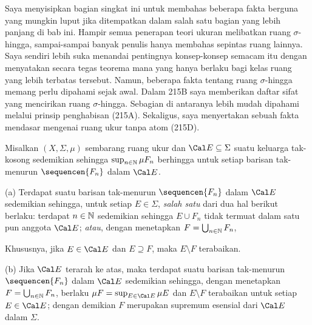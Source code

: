 
\def\chaptername{Taksonomi ruang ukur}
\def\sectionname{Ruang $\sigma$-hingga dan prinsip penghabisan}


Saya menyisipkan bagian singkat ini untuk membahas beberapa fakta berguna
yang mungkin luput jika ditempatkan dalam salah satu bagian yang lebih panjang
di bab ini. Hampir semua penerapan teori ukuran melibatkan ruang
$\sigma$-hingga, sampai-sampai banyak penulis hanya membahas sepintas ruang
lainnya. Saya sendiri lebih suka menandai pentingnya konsep-konsep semacam itu
dengan menyatakan secara tegas teorema mana yang hanya berlaku bagi kelas
ruang yang lebih terbatas tersebut. Namun, beberapa fakta tentang ruang
$\sigma$-hingga memang perlu dipahami sejak awal. Dalam 215B saya memberikan
daftar sifat yang mencirikan ruang $\sigma$-hingga. Sebagian di antaranya lebih
mudah dipahami melalui prinsip penghabisan (215A). Sekaligus, saya menyertakan
sebuah fakta mendasar mengenai ruang ukur
tanpa atom (215D).

 Misalkan $(X,\Sigma,\mu)$ sembarang ruang ukur dan
$\Cal E\subseteq\Sigma$ suatu keluarga tak-kosong sedemikian sehingga
$\sup_{n\in\Bbb N}\mu F_n$ berhingga untuk setiap barisan tak-menurun
$\sequencen{F_n}$ dalam $\Cal E$.

(a) Terdapat suatu barisan tak-menurun $\sequencen{F_n}$ dalam $\Cal E$
sedemikian sehingga, untuk setiap $E\in\Sigma$, {\it salah satu} dari dua
hal berikut berlaku: terdapat $n\in\Bbb N$ sedemikian sehingga $E\cup F_n$
tidak termuat dalam satu pun anggota $\Cal E$; {\it atau}, dengan menetapkan
$F=\bigcup_{n\in\Bbb N}F_n$,


\noindent Khususnya, jika $E\in\Cal E$ dan $E\supseteq F$, maka
$E\setminus F$ terabaikan.

(b) Jika $\Cal E$ terarah ke atas, maka terdapat suatu barisan tak-menurun
$\sequencen{F_n}$ dalam $\Cal E$ sedemikian sehingga, dengan menetapkan
$F=\bigcup_{n\in\Bbb N}F_n$, berlaku $\mu F=\sup_{E\in\Cal E}\mu E$ dan
$E\setminus F$ terabaikan untuk setiap $E\in\Cal E$; dengan demikian $F$
merupakan supremum esensial dari $\Cal E$ dalam $\Sigma$.

